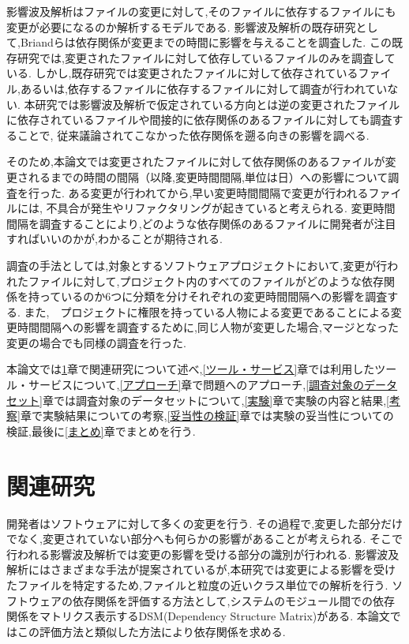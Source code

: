 \documentclass{fose2016}           %
\begin{document}
影響波及解析はファイルの変更に対して,そのファイルに依存するファイルにも変更が必要になるのか解析するモデルである.
影響波及解析の既存研究として,Briand\cite{Briand}らは依存関係が変更までの時間に影響を与えることを調査した.
この既存研究では,変更されたファイルに対して依存しているファイルのみを調査している.
しかし,既存研究では変更されたファイルに対して依存されているファイル,あるいは,依存するファイルに依存するファイルに対して調査が行われていない.
本研究では影響波及解析で仮定されている方向とは逆の変更されたファイルに依存されているファイルや間接的に依存関係のあるファイルに対しても調査することで,
従来議論されてこなかった依存関係を遡る向きの影響を調べる.

そのため,本論文では変更されたファイルに対して依存関係のあるファイルが変更されるまでの時間の間隔（以降,変更時間間隔,単位は日）への影響について調査を行った.
ある変更が行われてから,早い変更時間間隔で変更が行われるファイルには, 不具合が発生やリファクタリングが起きていると考えられる.
変更時間間隔を調査することにより,どのような依存関係のあるファイルに開発者が注目すればいいのかが,わかることが期待される.

調査の手法としては,対象とするソフトウェアプロジェクトにおいて,変更が行われたファイルに対して,プロジェクト内のすべてのファイルがどのような依存関係を持っているのか6つに分類を分けそれぞれの変更時間間隔への影響を調査する.
また,　プロジェクトに権限を持っている人物による変更であることによる変更時間間隔への影響を調査するために,同じ人物が変更した場合,マージとなった変更の場合でも同様の調査を行った.

本論文では\ref{関連研究}章で関連研究について述べ,\ref{ツール・サービス}章では利用したツール・サービスについて,\ref{アプローチ}章で問題へのアプローチ,\ref{調査対象のデータセット}章では調査対象のデータセットについて,\ref{実験}章で実験の内容と結果,\ref{考察}章で実験結果についての考察,\ref{妥当性の検証}章では実験の妥当性についての検証,最後に\ref{まとめ}章でまとめを行う.


\section{関連研究}\label{関連研究}
開発者はソフトウェアに対して多くの変更を行う.
その過程で,変更した部分だけでなく,変更されていない部分へも何らかの影響があることが考えられる.
そこで行われる影響波及解析では変更の影響を受ける部分の識別が行われる.
影響波及解析にはさまざまな手法が提案されているが\cite{Ryder,Kondo},本研究では変更による影響を受けたファイルを特定するため,ファイルと粒度の近いクラス単位での解析\cite{Ryder}を行う.
ソフトウェアの依存関係を評価する方法として,システムのモジュール間での依存関係をマトリクス表示するDSM(Dependency Structure Matrix)がある.\cite{Nord}
本論文ではこの評価方法と類似した方法により依存関係を求める.
\end{document}
